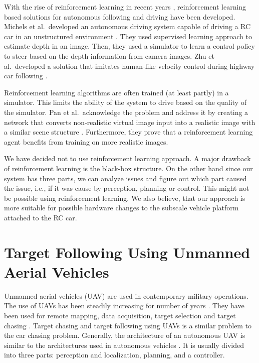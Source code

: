 \documentclass{ctuthesis/ctuthesis}
\begin{document}
With the rise of reinforcement learning in recent years \cite{alphago,deepstack,alphastar}, reinforcement learning based solutions for autonomous following and driving have been developed. Michels et al.\ developed an autonomous driving system capable of driving a RC car in an unstructured environment \cite{RL_autonomous_driving}. They used supervised learning approach to estimate depth in an image. Then, they used a simulator to learn a control policy to steer based on the depth information from camera images. Zhu et al.\ developed a solution that imitates human-like velocity control during highway car following \cite{RL_humanlike,RL_velocity}.\par


Reinforcement learning algorithms are often trained (at least partly) in a simulator. This limits the ability of the system to drive based on the quality of the simulator. Pan et al.\ acknowledge the problem and address it by creating a network that converts non-realistic virtual image input into a realistic image with a similar scene structure \cite{synthetic_images}. Furthermore, they prove that a reinforcement learning agent benefits from training on more realistic images.\par


We have decided not to use reinforcement learning approach. A major drawback of reinforcement learning is the black-box structure. On the other hand since our system has three parts, we can analyze issues and figure out which part caused the issue, i.e., if it was cause by perception, planning or control. This might not be possible using reinforcement learning. We also believe, that our approach is more suitable for possible hardware changes to the subscale vehicle platform attached to the RC car. 





\section{Target Following Using Unmanned Aerial Vehicles}
Unmanned aerial vehicles (UAV) are used in contemporary military operations. The use of UAVs has been steadily increasing for number of years \cite{UAV_good_or_bad}. They have been used for remote mapping, data acquisition, target selection and target chasing \cite{UAV_good_or_bad,UAV_use}. Target chasing and target following using UAVs is a similar problem to the car chasing problem. Generally, the architecture of an autonomous UAV is similar to the architectures used in autonomous vehicles \cite{target_following_alg,uva_tracking_formula}. It is usually divided into three parts: perception and localization, planning, and a controller. \par
\end{document}
